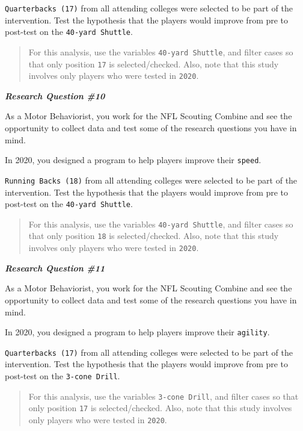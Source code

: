 \documentclass[11pt,]{article}
\begin{document}
\texttt{Quarterbacks\ (17)} from all attending colleges were selected to
be part of the intervention. Test the hypothesis that the players would
improve from pre to post-test on the \texttt{40-yard\ Shuttle}.

\begin{quote}
For this analysis, use the variables \texttt{40-yard\ Shuttle}, and
filter cases so that only position \texttt{17} is selected/checked.
Also, note that this study involves only players who were tested in
\texttt{2020}.
\end{quote}

\textbf{\emph{Research Question \#10}}

As a Motor Behaviorist, you work for the NFL Scouting Combine and see
the opportunity to collect data and test some of the research questions
you have in mind.

In 2020, you designed a program to help players improve their
\texttt{speed}.

\texttt{Running\ Backs\ (18)} from all attending colleges were selected
to be part of the intervention. Test the hypothesis that the players
would improve from pre to post-test on the \texttt{40-yard\ Shuttle}.

\begin{quote}
For this analysis, use the variables \texttt{40-yard\ Shuttle}, and
filter cases so that only position \texttt{18} is selected/checked.
Also, note that this study involves only players who were tested in
\texttt{2020}.
\end{quote}

\textbf{\emph{Research Question \#11}}

As a Motor Behaviorist, you work for the NFL Scouting Combine and see
the opportunity to collect data and test some of the research questions
you have in mind.

In 2020, you designed a program to help players improve their
\texttt{agility}.

\texttt{Quarterbacks\ (17)} from all attending colleges were selected to
be part of the intervention. Test the hypothesis that the players would
improve from pre to post-test on the \texttt{3-cone\ Drill}.

\begin{quote}
For this analysis, use the variables \texttt{3-cone\ Drill}, and filter
cases so that only position \texttt{17} is selected/checked. Also, note
that this study involves only players who were tested in \texttt{2020}.
\end{quote}
\end{document}
